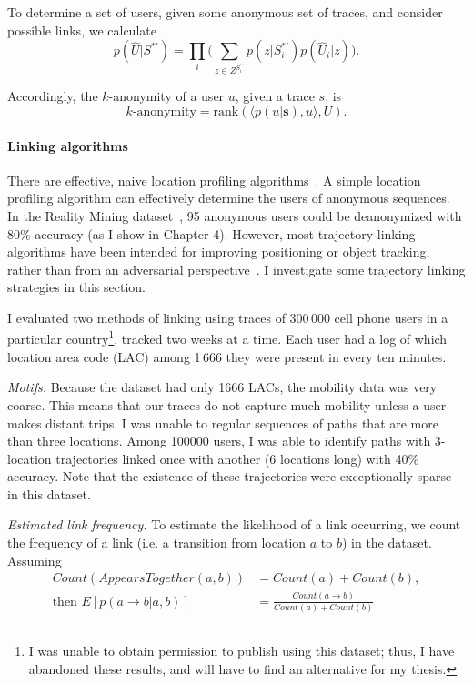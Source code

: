 To determine a set of users, given some anonymous set of traces, and consider possible links, we calculate
\begin{equation}
p(\hat{U}|S^{*'}) = \prod_i \big( \sum_{z\in Z^{S^{*'}_i}} p(z|S^{*'}_i) p(\hat{U}_i|z) \big).
\end{equation}

Accordingly, the $k$-anonymity of a user $u$, given a trace $s$, is 
\begin{equation}
k\textrm{-anonymity} = \textrm{rank}(\langle p(u|\mathbf{s}), u \rangle, U).
\end{equation}

\paragraph*{Linking algorithms}

There are effective, naive location profiling algorithms~\cite{de2008identification}. A simple location profiling algorithm can effectively determine the users of anonymous sequences. In the Reality Mining dataset~\cite{eagle2006reality}, 95 anonymous users could be deanonymized with 80\% accuracy (as I show in Chapter 4). %
However, most trajectory linking algorithms have been intended for improving positioning or object tracking, rather than from an adversarial perspective~\cite{jaqaman2008robust,yang2012online,qin2012improving}. I investigate some trajectory linking strategies in this section.

I evaluated two methods of linking using traces of 300\,000 cell phone users in a particular country\footnote{I was unable to obtain permission to publish using this dataset; thus, I have abandoned these results, and will have to find an alternative for my thesis.}, tracked two weeks at a time. Each user had a log of which location area code (LAC) among 1\,666 they were present in every ten minutes.

\emph{Motifs.} Because the dataset had only 1666 LACs, the mobility data was very coarse. This means that our traces do not capture much mobility unless a user makes distant trips. I was unable to regular sequences of paths that are more than three locations. Among 100000 users, I was able to identify paths with 3-location trajectories linked once with another (6 locations long) with 40\% accuracy. Note that the existence of these trajectories were exceptionally sparse in this dataset.

\emph{Estimated link frequency.} To estimate the likelihood of a link occurring, we count the frequency of a link (i.e. a transition from location $a$ to $b$) in the dataset. 
Assuming
\begin{align}
	Count(AppearsTogether(a,b))&=Count(a) + Count(b),\label{eq:link}\\
	\textrm{then } E[p(a\rightarrow b|a,b)] &= \frac{Count(a\to b)}{Count(a)+Count(b)}\label{eq:link2}
\end{align} 

